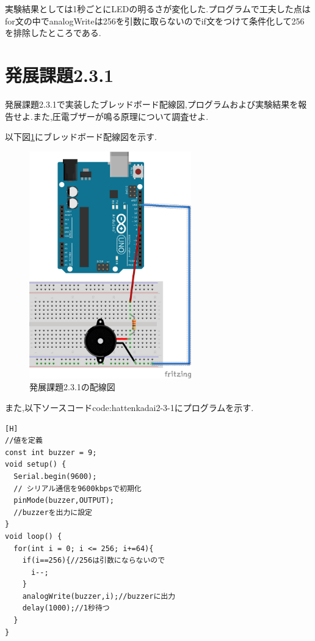 \documentclass{jarticle}
\begin{document}
実験結果としては1秒ごとにLEDの明るさが変化した.プログラムで工夫した点はfor文の中でanalogWriteは256を引数に取らないのでif文をつけて条件化して256を排除したところである.

\section{発展課題2.3.1}

発展課題2.3.1で実装したブレッドボード配線図,プログラムおよび実験結果を報告せよ.また,圧電ブザーが鳴る原理について調査せよ.

以下図\ref{fig:hattenkadai2-3-1bread}にブレッドボード配線図を示す.

\begin{figure}[H]
\begin{center}
\includegraphics[width=7.0cm]{images/hatten2-3-1_bread.png}
\caption{発展課題2.3.1の配線図}
\label{fig:hattenkadai2-3-1bread}
\end{center}
\end{figure}

また,以下ソースコード{code:hattenkadai2-3-1}にプログラムを示す.

\begin{lstlisting}[caption=発展課題2.3.1,label=code:hattenkadai2-3-1][H]
//値を定義
const int buzzer = 9;
void setup() {
  Serial.begin(9600);
  // シリアル通信を9600kbpsで初期化
  pinMode(buzzer,OUTPUT);
  //buzzerを出力に設定
}
void loop() {
  for(int i = 0; i <= 256; i+=64){
    if(i==256){//256は引数にならないので
      i--;
    }
    analogWrite(buzzer,i);//buzzerに出力
    delay(1000);//1秒待つ
  }
}
\end{lstlisting}
\end{document}
